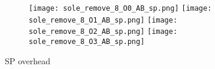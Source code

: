 \documentclass[11pt]{article}
\begin{document}
    \begin{figure}[ht]
        \begin{subfigure}{\linewidth}
            \texttt{[image: sole\_remove\_8\_O0\_AB\_sp.png]}
            \texttt{[image: sole\_remove\_8\_O1\_AB\_sp.png]}
            \texttt{[image: sole\_remove\_8\_O2\_AB\_sp.png]}
            \texttt{[image: sole\_remove\_8\_O3\_AB\_sp.png]}
        \end{subfigure}\par\medskip
        \caption{SP overhead}
        \label{fig:sole_figs_8}
    \end{figure}
\end{document}
